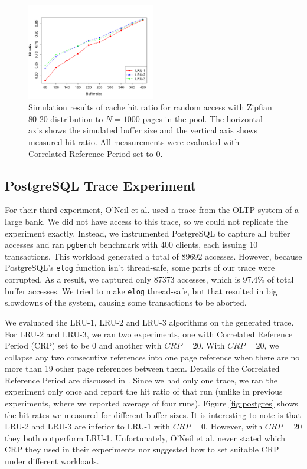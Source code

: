 \begin{figure}[t!]
    \centering
	\includegraphics[width=0.5\textwidth]{./figures/zipfian.pdf}
	\caption{Simulation results of cache hit ratio for random access with Zipfian 80-20 distribution to $N = 1000$ pages in the pool. The horizontal axis shows the simulated buffer size and the vertical axis shows measured hit ratio. All measurements were evaluated with Correlated Reference Period set to 0.}
	\label{fig:zipfian}
\end{figure}


\subsection{PostgreSQL Trace Experiment}

For their third experiment, O'Neil et al. \cite{lruk} used a trace from the OLTP system of a large bank. We did not have access to this trace, so we could not replicate the experiment exactly. Instead, we instrumented PostgreSQL to capture all buffer accesses and ran \texttt{pgbench} benchmark with 400 clients, each issuing 10 transactions. This workload generated a total of 89692 accesses. However, because PostgreSQL's \texttt{elog} function isn't thread-safe, some parts of our trace were corrupted. As a result, we captured only 87373 accesses, which is 97.4\% of total buffer accesses. We tried to make \texttt{elog} thread-safe, but that resulted in big slowdowns of the system, causing some transactions to be aborted.

We evaluated the LRU-1, LRU-2 and LRU-3 algorithms on the generated trace. For LRU-2 and LRU-3, we ran two experiments, one with Correlated Reference Period (CRP) set to be 0 and another with $CRP = 20$. With $CRP = 20$, we collapse any two consecutive references into one page reference when there are no more than 19 other page references between them. Details of the Correlated Reference Period are discussed in \cite{lruk}. Since we had only one trace, we ran the experiment only once and report the hit ratio of that run (unlike in previous experiments, where we reported average of four runs). Figure \ref{fig:postgres} shows the hit rates we measured for different buffer sizes. It is interesting to note is that LRU-2 and LRU-3 are inferior to LRU-1 with $CRP = 0$. However, with $CRP = 20$ they both outperform LRU-1. Unfortunately, O'Neil et al. \cite{lruk} never stated which CRP they used in their experiments nor suggested how to set suitable CRP under different workloads.

